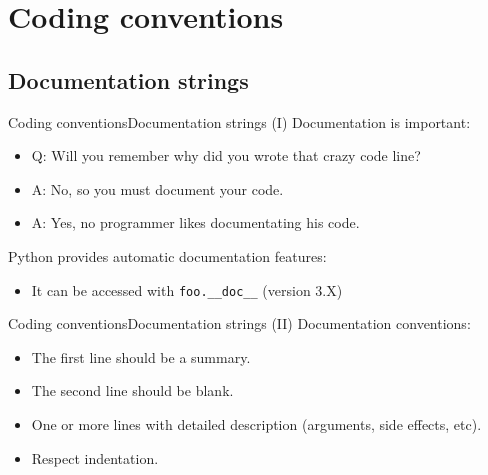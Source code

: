 \documentclass[10pt,compress]{beamer} %
\begin{document}
\section{Coding conventions}
\subsection{Documentation strings}
\begin{frame}{Coding conventions}{Documentation strings (I)}
\vspace{-0.3cm}
	Documentation is important:
		\begin{itemize}
		\item \small {Q: Will you remember why did you wrote that crazy code line?}
		\item \small {A: No, so you must document your code.}
		\item \small {A: Yes, no programmer likes documentating his code.}
		\end{itemize}
	Python provides automatic documentation features:
		\begin{itemize}
		\item \small It can be accessed with \texttt{foo.\_\_doc\_\_} (version 3.X)
		\end{itemize}
	\vspace{-0.2cm}
		\scriptsize{
		\begin{exampleblock}{}
		\vspace{-0.4cm}
		
		\vspace{-0.2cm}
		\end{exampleblock}
		}
\end{frame}

\begin{frame}{Coding conventions}{Documentation strings (II)}
	Documentation conventions:
		\begin{itemize}
		\item The first line should be a summary.
		\item The second line should be blank.
		\item One or more lines with detailed description (arguments, side effects, etc).
		\item Respect indentation.
		\end{itemize}

		\vspace{-0.4cm}
    	\begin{columns}
		\begin{block}{}
		\vspace{-0.2cm}
		
		\vspace{-0.2cm}
		\end{block}
		\end{columns}
\end{frame}
\end{document}
